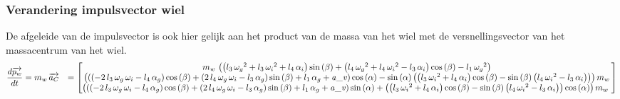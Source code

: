 \subsubsection{Verandering impulsvector wiel}
De afgeleide van de impulsvector is ook hier gelijk aan het product van de massa van het wiel met de versnellingsvector van het massacentrum van het wiel.
\begin{equation}
\begin{split}
\frac{d\overrightarrow{{p}_{w}}}{dt}
&=m_{w}\,\overrightarrow{{a}_{C}}
&=	  \begin{bmatrix}
      m_{w}\, \left(  \left( l_{3}\,{\omega_{g}}^{
2}+l_{3}\,{\omega_{i}}^{2}+l_{4}\,\alpha_{i} \right) \sin \left( \beta
 \right) + \left( l_{4}\,{\omega_{g}}^{2}+l_{4}\,{\omega_{i}}^{2}-l_{3
}\,\alpha_{i} \right) \cos \left( \beta \right) -l_{1}\,{\omega_{g}}^{
2} \right) \\ 
%
 \left(  \left(  \left( -2\,l_{3}\,
\omega_{g}\,\omega_{i}-l_{4}\,\alpha_{g} \right) \cos \left( \beta
 \right) + \left( 2\,l_{4}\,\omega_{g}\,\omega_{i}-l_{3}\,\alpha_{g}
 \right) \sin \left( \beta \right) +l_{1}\,\alpha_{g}+{\it a\_v}
 \right) \cos \left( \alpha \right) -\sin \left( \alpha \right) 
 \left(  \left( l_{3}\,{\omega_{i}}^{2}+l_{4}\,\alpha_{i} \right) \cos
 \left( \beta \right) -\sin \left( \beta \right)  \left( l_{4}\,{
\omega_{i}}^{2}-l_{3}\,\alpha_{i} \right)  \right)  \right) m_{w}
\\ 
%
 \left(  \left(  \left( -2\,l_{3}\,\omega_{g}\,
\omega_{i}-l_{4}\,\alpha_{g} \right) \cos \left( \beta \right) +
 \left( 2\,l_{4}\,\omega_{g}\,\omega_{i}-l_{3}\,\alpha_{g} \right) 
\sin \left( \beta \right) +l_{1}\,\alpha_{g}+{\it a\_v} \right) \sin
 \left( \alpha \right) + \left(  \left( l_{3}\,{\omega_{i}}^{2}+l_{4}
\,\alpha_{i} \right) \cos \left( \beta \right) -\sin \left( \beta
 \right)  \left( l_{4}\,{\omega_{i}}^{2}-l_{3}\,\alpha_{i} \right) 
 \right) \cos \left( \alpha \right)  \right) m_{w}\
      \end{bmatrix}
\end{split}
\end{equation}